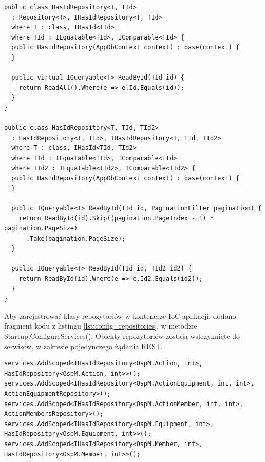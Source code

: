 \begin{lstlisting}[language=CSharp, caption=Generyczne klasy repozytoriów dla zasobów posiadających klucz główny lub klucz złożony z dwóch atrybutów, label=lst:repository_id]
public class HasIdRepository<T, TId>
  : Repository<T>, IHasIdRepository<T, TId>
  where T : class, IHasId<TId>
  where TId : IEquatable<TId>, IComparable<TId> {
  public HasIdRepository(AppDbContext context) : base(context) {
  }

  public virtual IQueryable<T> ReadById(TId id) {
    return ReadAll().Where(e => e.Id.Equals(id));
  }
}

public class HasIdRepository<T, TId, TId2>
  : HasIdRepository<T, TId>, IHasIdRepository<T, TId, TId2>
  where T : class, IHasId<TId, TId2>
  where TId : IEquatable<TId>, IComparable<TId>
  where TId2 : IEquatable<TId2>, IComparable<TId2> {
  public HasIdRepository(AppDbContext context) : base(context) {
  }

  public IQueryable<T> ReadById(TId id, PaginationFilter pagination) {
    return ReadById(id).Skip((pagination.PageIndex - 1) * pagination.PageSize)
      .Take(pagination.PageSize);
  }

  public IQueryable<T> ReadById(TId id, TId2 id2) {
    return ReadById(id).Where(e => e.Id2.Equals(id2));
  }
}
\end{lstlisting}

Aby zarejestrować klasy repozytoriów w kontenerze IoC aplikacji, dodano fragment kodu z listingu \ref{lst:config_repositories}, w metodzie Startup.ConfigureServices(). Obiekty repozytoriów zostają wstrzyknięte do serwisów, w zakresie pojedynczego żądania REST.

\begin{lstlisting}[language=CSharp, caption={Fragment metody Startup.ConfigureServices(), rejestrujący klasy repozytoriów zasobów, w kontenerze IoC}, label=lst:config_repositories]
services.AddScoped<IHasIdRepository<OspM.Action, int>, HasIdRepository<OspM.Action, int>>();
services.AddScoped<IHasIdRepository<OspM.ActionEquipment, int, int>, ActionEquipmentRepository>();
services.AddScoped<IHasIdRepository<OspM.ActionMember, int, int>, ActionMembersRepository>();
services.AddScoped<IHasIdRepository<OspM.Equipment, int>, HasIdRepository<OspM.Equipment, int>>();
services.AddScoped<IHasIdRepository<OspM.Member, int>, HasIdRepository<OspM.Member, int>>();
\end{lstlisting}

